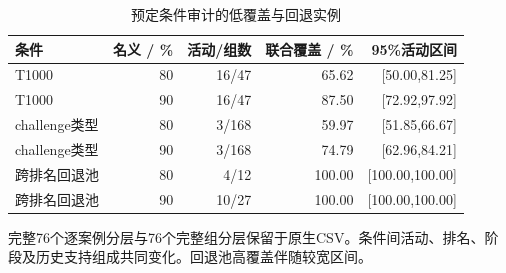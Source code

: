 \begin{table}[!htbp]\centering
\caption{预定条件审计的低覆盖与回退实例}\label{tab:round2conditions}
\small\setlength{\tabcolsep}{4pt}
\begin{tabularx}{\linewidth}{L r r r r}\toprule
条件 & 名义 / \% & 活动/组数 & 联合覆盖 / \% & 95\%活动区间 \\
\midrule
T1000 & 80 & 16/47 & 65.62 & [50.00,81.25] \\
T1000 & 90 & 16/47 & 87.50 & [72.92,97.92] \\
challenge类型 & 80 & 3/168 & 59.97 & [51.85,66.67] \\
challenge类型 & 90 & 3/168 & 74.79 & [62.96,84.21] \\
跨排名回退池 & 80 & 4/12 & 100.00 & [100.00,100.00] \\
跨排名回退池 & 90 & 10/27 & 100.00 & [100.00,100.00] \\
\bottomrule\end{tabularx}
\par\vspace{3pt}\begin{minipage}{\linewidth}\footnotesize 完整76个逐案例分层与76个完整组分层保留于原生CSV。条件间活动、排名、阶段及历史支持组成共同变化。回退池高覆盖伴随较宽区间。\end{minipage}
\end{table}
